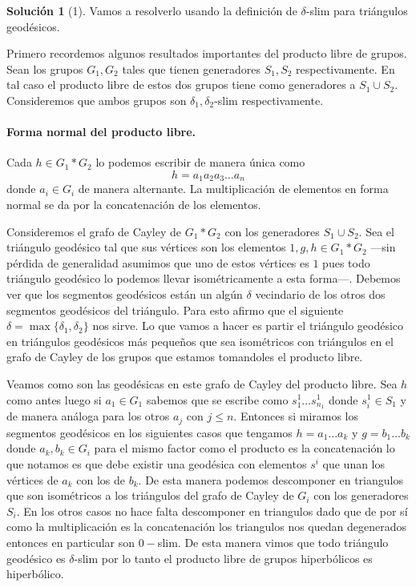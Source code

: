 \documentclass[12pt]{article}
\theoremstyle{plain}
\theoremstyle{definition}
\newtheorem*{sol}{Solución}
\theoremstyle{remark}
\begin{document}
\begin{sol}[1] Vamos a resolverlo usando la definición de $\delta$-slim para triángulos geodésicos. 
	
Primero recordemos algunos resultados importantes del producto libre de grupos. Sean los grupos $G_1, G_2$ tales que tienen generadores $S_1,S_2$ respectivamente. En tal caso el producto libre de estos dos grupos tiene como generadores a $S_1 \cup S_2$. Consideremos que ambos grupos son $\delta_1, \delta_2$-slim respectivamente.
{\small \paragraph{{\small Forma normal del producto libre.}}
	Cada $h \in G_1  * G_2$ lo podemos escribir de manera única como $$h= a_1a_2a_3 \dots a_n$$ donde $a_i \in G_i$ de manera alternante. La multiplicación de elementos en forma normal se da por la concatenación de los elementos. 
}
\medskip

Consideremos el grafo de Cayley de $G_1 * G_2$ con los generadores $S_1 \cup S_2$. Sea el triángulo geodésico tal que sus vértices son los elementos $1,g,h \in G_1 * G_2$ ---sin pérdida de generalidad asumimos que uno de estos vértices es $1$ pues todo triángulo geodésico lo podemos llevar isométricamente a esta forma---. Debemos ver que los segmentos geodésicos están un algún $\delta$ vecindario de los otros dos segmentos geodésicos del triángulo. Para esto afirmo que el siguiente $\delta = \max \{\delta_1, \delta_2\}$ nos sirve. Lo que vamos a hacer es partir el triángulo geodésico en triángulos geodésicos más pequeños que sea isométricos con triángulos en el grafo de Cayley de los grupos que estamos tomandoles el producto libre. 

Veamos como son las geodésicas en este grafo de Cayley del producto libre. Sea $h$ como antes luego si $a_1 \in G_1$ sabemos que se escribe como $s^1_1 \dots s^1_{n_1}$ donde $s^1_i \in S_1$ y de manera análoga para los otros $a_j$ con $j \le n$. Entonces si miramos los segmentos geodésicos en los siguientes casos que tengamos $h=a_1 \dots a_k$ y $g=b_1 \dots b_k$ donde $a_k, b_k \in G_i$ para el mismo factor como el producto es la concatenación lo que notamos es que debe existir una geodésica con elementos $s^i$ que unan los vértices de $a_k$ con los de $b_k$. De esta manera podemos descomponer en triangulos que son isométricos a los triángulos del grafo de Cayley de $G_i$ con los generadores $S_i$. En los otros casos no hace falta descomponer en triangulos dado que de por sí como la multiplicación es la concatenación los triangulos nos quedan degenerados entonces en particular son $0-$slim. De esta manera vimos que todo triángulo geodésico es $\delta$-slim por lo tanto el producto libre de grupos hiperbólicos es hiperbólico. 
	
\end{sol}
\end{document}
